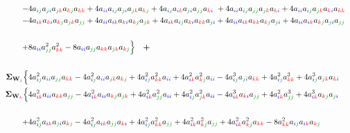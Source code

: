 \documentclass{article}
\begin{document}
\begin{equation}
\begin{aligned}
\\
- & 4 a_{\idx{i}{j}} a_{\idx{j}{i}} a_{\idx{j}{k}} a_{\idx{k}{j}} a_{\idx{k}{k}} + 4 a_{\idx{i}{i}} a_{\idx{i}{j}} a_{\idx{j}{i}} a_{\idx{j}{k}} a_{\idx{k}{j}} +4 a_{\idx{i}{j}} a_{\idx{i}{k}} a_{\idx{j}{i}} a_{\idx{j}{j}} a_{\idx{k}{i}} \ + 4 a_{\idx{i}{i}} a_{\idx{i}{j}} a_{\idx{j}{j}} a_{\idx{j}{k}} a_{\idx{k}{i}} + 4 a_{\idx{i}{i}} a_{\idx{i}{j}} a_{\idx{j}{k}} a_{\idx{k}{i}} a_{\idx{k}{k}}  \\
- &4 a_{\idx{i}{k}} a_{\idx{k}{i}} a_{\idx{k}{j}}a_{\idx{j}{k}} a_{\idx{j}{j}}   + 4 a_{\idx{i}{i}} a_{\idx{i}{k}} a_{\idx{k}{i}} a_{\idx{k}{j}} a_{\idx{j}{k}}   + 4 a_{\idx{i}{k}} a_{\idx{i}{j}} a_{\idx{k}{i}} a_{\idx{k}{k}} a_{\idx{j}{i}}   + 4 a_{\idx{i}{i}} a_{\idx{i}{k}} a_{\idx{k}{k}} a_{\idx{k}{j}} a_{\idx{j}{i}}   + 4 a_{\idx{i}{i}} a_{\idx{i}{k}} a_{\idx{k}{j}} a_{\idx{j}{i}} a_{\idx{j}{j}}  \\
\\
+ & 8 a_{\idx{i}{i}} a_{\idx{j}{j}}^{2} a_{\idx{k}{k}}^{2} - 8 a_{\idx{i}{i}} a_{\idx{j}{j}} a_{\idx{k}{k}} a_{\idx{j}{k}} a_{\idx{k}{j}}  \Bigr\} \quad \textbf{+} \\
\\
\mathbf{\Sigma}_{\textbf{W}_{\cidx{j}}} \Bigl\{ & 4 a_{\idx{i}{j}}^{2}  a_{\idx{i}{i}} a_{\idx{j}{j}} a_{\idx{k}{k}} - 4 a_{\idx{i}{j}}^{2}  a_{\idx{i}{i}} a_{\idx{j}{k}} a_{\idx{k}{j}} + 4 a_{\idx{i}{j}}^{2} a_{\idx{k}{k}}^{2} a_{\idx{i}{i}}   + 4 a_{\idx{i}{k}}^{2} a_{\idx{k}{j}}^{2} a_{\idx{i}{i}}   - 4 a_{\idx{i}{j}}^{3} a_{\idx{j}{i}} a_{\idx{k}{k}} + 4 a_{\idx{i}{j}}^{2} a_{\idx{k}{k}}^{3} + 4 a_{\idx{i}{j}}^{3} a_{\idx{j}{k}} a_{\idx{k}{i}} \\
\mathbf{\Sigma}_{\textbf{W}_{\cidx{k}}} \Bigl\{ & 4 a_{\idx{i}{k}}^{2} a_{\idx{i}{i}}  a_{\idx{k}{k}} a_{\idx{j}{j}} - 4 a_{\idx{i}{k}}^{2} a_{\idx{i}{i}} a_{\idx{k}{j}}  a_{\idx{j}{k}} + 4 a_{\idx{i}{k}}^{2} a_{\idx{j}{j}}^{2} a_{\idx{i}{i}}   +4  a_{\idx{i}{j}}^{2} a_{\idx{j}{k}}^{2} a_{\idx{i}{i}}- 4 a_{\idx{i}{k}}^{3} a_{\idx{k}{i}} a_{\idx{j}{j}}  + 4 a_{\idx{i}{k}}^{2} a_{\idx{j}{j}}^{3} + 4 a_{\idx{i}{k}}^{3} a_{\idx{k}{j}} a_{\idx{j}{i}}  \\
\\
+ & 4 a_{\idx{i}{j}}^{2} a_{\idx{i}{k}} a_{\idx{j}{i}} a_{\idx{k}{j}} - 4 a_{\idx{i}{j}}^{2} a_{\idx{i}{k}} a_{\idx{j}{j}} a_{\idx{k}{i}} + 4 a_{\idx{i}{j}}^{2} a_{\idx{k}{k}}^{2} a_{\idx{j}{j}} + 4 a_{\idx{i}{k}}^{2} a_{\idx{k}{j}}^{2} a_{\idx{j}{j}}  + 4 a_{\idx{i}{k}}^{2} a_{\idx{k}{j}}^{2} a_{\idx{k}{k}} -8 a_{\idx{k}{k}}^{2} a_{\idx{i}{j}} a_{\idx{i}{k}} a_{\idx{k}{j}}   \\

\end{aligned}
\end{equation}
\end{document}
